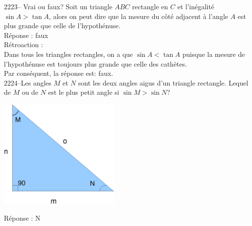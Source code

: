 \documentclass[letterpaper, 12pt]{article}
\begin{document}
2223-- Vrai ou faux? Soit un triangle $ABC$ rectangle en $C$ et l'in\'egalit\'e $\sin{A}>\tan{A}$, alors on peut dire que la mesure du c\^ot\'e adjacent \`a l'angle $A$ est plus grande que celle de l'hypoth\'enuse. \\

R\'eponse : faux\\

R\'etroaction :\\
Dans tous les triangles rectangles, on a que $\sin{A}<\tan{A}$ puisque la mesure de l'hypoth\'enuse est toujours plus grande que celle des cath\`etes.\\
Par cons\'equent, la r\'eponse est: faux.\\

2224--Les angles $M$ et $N$ sont les deux angles aigus d'un triangle rectangle. Lequel de $M$ ou de $N$ est le plus petit angle si $\sin{M}>\sin{N}$? \\
\begin{center}
 \includegraphics[width=6cm,bb=14 14 583 529]{Triangle_rectangle3.eps}
\end{center}

R\'eponse : N\\
\end{document}
